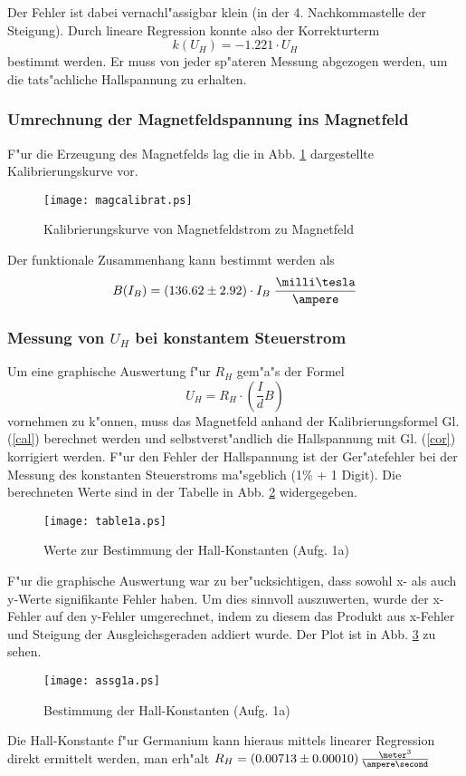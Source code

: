 \documentclass[a4paper,10pt]{article}
\begin{document}
Der Fehler ist dabei vernachl"assigbar klein (in der 4. Nachkommastelle der Steigung). Durch lineare Regression konnte also der Korrekturterm \begin{equation}
k(U_H) = -1.221 \cdot U_H \label{cor}
\end{equation}
bestimmt werden. Er muss von jeder sp"ateren Messung abgezogen werden, um die tats"achliche Hallspannung zu erhalten.

\subsubsection*{Umrechnung der Magnetfeldspannung ins Magnetfeld}
F"ur die Erzeugung des Magnetfelds lag die in Abb. \ref{magcalibrate} dargestellte Kalibrierungskurve vor.
\begin{figure}[p]
    \centering
         \texttt{[image: magcalibrat.ps]}
         \caption{Kalibrierungskurve von Magnetfeldstrom zu Magnetfeld}
       \label{magcalibrate}
\end{figure}
Der funktionale Zusammenhang kann bestimmt werden als \begin{equation}
B(I_B) = (136.62 \pm 2.92)\cdot I_B \; \frac{\milli\tesla}{\ampere} \label{cal}
\end{equation}


\subsubsection*{Messung von $U_H$ bei konstantem Steuerstrom}
Um eine graphische Auswertung f"ur $R_H$ gem"a"s der Formel \begin{equation}
U_H = R_H \cdot \left( \frac{I}{d}{B}\right) \end{equation} vornehmen zu k"onnen, muss das Magnetfeld anhand der Kalibrierungsformel Gl. (\ref{cal}) berechnet werden und selbstverst"andlich die Hallspannung mit Gl. (\ref{cor}) korrigiert werden. F"ur den Fehler der Hallspannung ist der Ger"atefehler bei der Messung des konstanten Steuerstroms ma"sgeblich (1\% + 1 Digit). Die berechneten Werte sind in der Tabelle in Abb. \ref{table1a} widergegeben.
\begin{figure}[p]
    \centering
    \texttt{[image: table1a.ps]}
\caption{Werte zur Bestimmung der Hall-Konstanten (Aufg. 1a)}
\label{table1a}
\end{figure}
F"ur die graphische Auswertung war zu ber"ucksichtigen, dass sowohl x- als auch y-Werte signifikante Fehler haben. Um dies sinnvoll auszuwerten, wurde der x-Fehler auf den y-Fehler umgerechnet, indem zu diesem das Produkt aus x-Fehler und Steigung der Ausgleichsgeraden addiert wurde. Der Plot ist in Abb. \ref{plot1a} zu sehen.
\begin{figure}[p]
    \centering
         \texttt{[image: assg1a.ps]}
         \caption{Bestimmung der Hall-Konstanten (Aufg. 1a)}
       \label{plot1a}
\end{figure}
Die Hall-Konstante f"ur Germanium kann hieraus mittels linearer Regression direkt ermittelt werden, man erh"alt $R_H = (0.00713 \pm 0.00010) \, \frac{\meter^3}{\ampere \second}$
\end{document}
